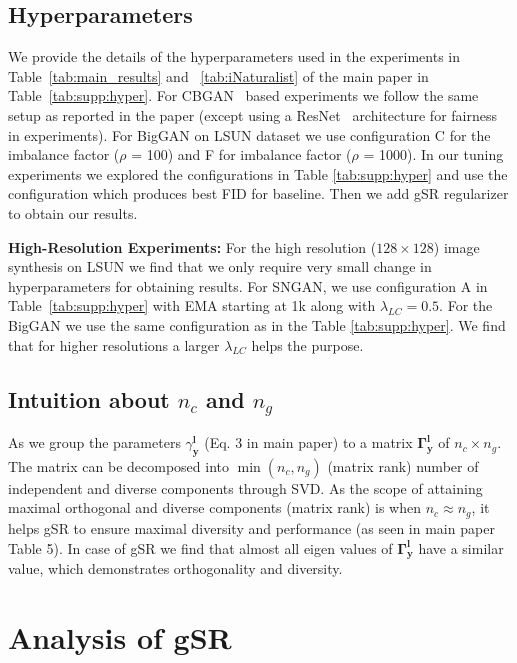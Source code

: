 \documentclass[runningheads,table]{llncs}
\begin{document}
\subsection{Hyperparameters}
\label{subsec:supp:hparams}
We provide the details of the hyperparameters used in the experiments in Table~\ref{tab:main_results} and ~\ref{tab:iNaturalist} of the main paper in Table~\ref{tab:supp:hyper}. For CBGAN~\cite{rangwani2021class} based experiments we follow the same setup as reported in the paper (except using a ResNet~\cite{gulrajani2017improved} architecture for fairness in experiments). For BigGAN on LSUN dataset we use configuration C for the imbalance factor ($\rho$ = 100) and F for imbalance factor ($\rho$ = 1000). In our tuning experiments we explored the configurations in Table \ref{tab:supp:hyper} and use the configuration which produces best FID for baseline. Then we add gSR regularizer to obtain our results. 

\noindent \vspace{1mm} \textbf{High-Resolution Experiments:} For the high resolution ($128 \times 128$) image synthesis on LSUN we find that we only require very small change in hyperparameters for obtaining results. For SNGAN, we use configuration A in Table~\ref{tab:supp:hyper} with EMA starting at 1k along with $\lambda_{LC} = 0.5$. For the BigGAN we use the same configuration as in the Table \ref{tab:supp:hyper}. We find that for higher resolutions a larger $\lambda_{LC}$ helps the purpose.

\subsection{Intuition about $n_c$ and $n_g$}
\label{subsec:supp:intuition}
As we group the parameters $\gamma_{\mathbf{y}}^{\mathbf{l}}$ (Eq. {\color{red} 3} in main paper) to a matrix $\mathbf{\Gamma_{\mathbf{y}}^{\mathbf{l}}}$ of $n_c \times n_g$. The matrix can be decomposed into $\min(n_c,n_g)$ (matrix rank) number of independent and diverse components through SVD. As the scope of attaining maximal orthogonal and diverse components (matrix rank) is when $n_c \approx n_g$, it helps gSR to ensure maximal diversity and performance (as seen in main paper Table {\color{red} 5}). In case of gSR we find that almost all eigen values of $\mathbf{\Gamma_{\mathbf{y}}^{\mathbf{l}}}$ have a similar value, which demonstrates orthogonality and diversity. \\

\section{Analysis of gSR}
\label{sec:supp:analysis_gsr} 
\end{document}
